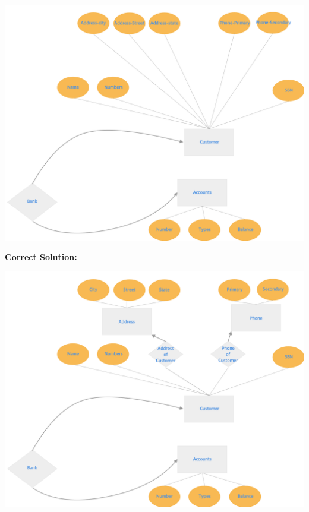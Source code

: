 \documentclass[12pt]{article}
\begin{document}
\begin{enumerate}[1.]
\begin{enumerate}[a)]
        \begin{center}
        \includegraphics[width=\linewidth]{images/worksheet_14_solution_19.png}
        \end{center}

        \bigskip

        \begin{mdframed}
            \underline{\textbf{Correct Solution:}}

            \bigskip

            \begin{center}
            \includegraphics[width=\linewidth]{images/worksheet_14_solution_20.png}
            \end{center}


\end{mdframed}
\end{enumerate}
\end{enumerate}
\end{document}
